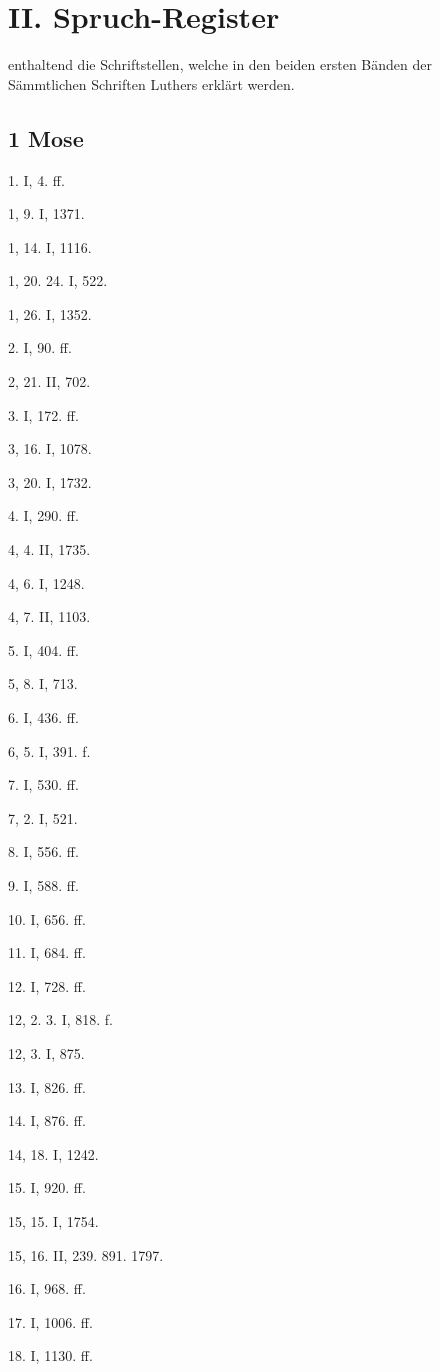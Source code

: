 \chapter{II. Spruch-Register}
enthaltend die Schriftstellen, welche in den beiden ersten Bänden der Sämmtlichen Schriften Luthers erklärt werden.

\section{1 Mose}

1. I, 4. ff.

1, 9. I, 1371.

1, 14. I, 1116.

1, 20. 24. I, 522.

1, 26. I, 1352.

2. I, 90. ff.

2, 21. II, 702.

3. I, 172. ff.

3, 16. I, 1078.

3, 20. I, 1732.

4. I, 290. ff.

4, 4. II, 1735.

4, 6. I, 1248.

4, 7. II, 1103.

5. I, 404. ff.

5, 8. I, 713.

6. I, 436. ff.

6, 5. I, 391. f.

7. I, 530. ff.

7, 2. I, 521.

8. I, 556. ff.

9. I, 588. ff.

10. I, 656. ff.

11. I, 684. ff.

12. I, 728. ff.

12, 2. 3. I, 818. f.

12, 3. I, 875.

13. I, 826. ff.

14. I, 876. ff.

14, 18. I, 1242.

15. I, 920. ff.

15, 15. I, 1754.

15, 16. II, 239. 891. 1797.

16. I, 968. ff.

17. I, 1006. ff.

18. I, 1130. ff.

